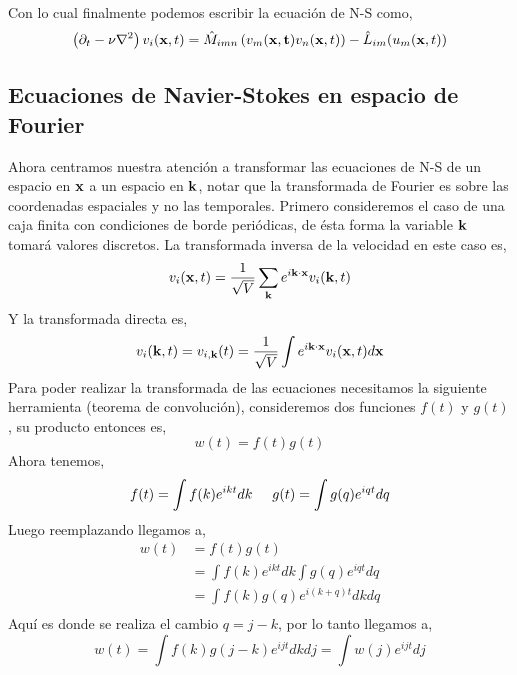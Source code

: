 \documentclass[executivepaper,12pt]{article}
\numberwithin{equation}{section}
\begin{document}
Con lo cual finalmente podemos escribir la ecuación de N-S como,
\begin{equation}
	\left(\partial_t-\nu\laplacian{}\right)v_i(\vb{x},t)=\hat{M}_{imn}\left(v_m(\vb{x,t})v_n(\vb{x},t)\right)-\hat{L}_{im}(u_m(\vb{x},t))
\end{equation}

\subsection{Ecuaciones de Navier-Stokes en espacio de Fourier}

Ahora centramos nuestra atención a transformar las ecuaciones de N-S de un espacio en $\vb{x}$ a un espacio en $\vb{k}$, notar que la transformada de Fourier es sobre las coordenadas espaciales y no las temporales. Primero consideremos el caso de una caja finita con condiciones de borde periódicas, de ésta forma la variable $\vb{k}$ tomará valores discretos. La transformada inversa de la velocidad en este caso es,
\begin{equation*}
	v_i(\vb{x},t)=\frac{1}{\sqrt{V}}\sum_{\vb{k}}e^{i\vb{k}\cdot\vb{x}}v_i(\vb{k},t)
\end{equation*}
Y la transformada directa es,
\begin{equation*}
	v_i(\vb{k},t)=v_{i,\vb{k}}(t)=\frac{1}{\sqrt{V}}\int e^{i\vb{k}\cdot\vb{x}} v_i(\vb{x},t)d\vb{x}
\end{equation*}
Para poder realizar la transformada de las ecuaciones necesitamos la siguiente herramienta (teorema de convolución), consideremos dos funciones $f(t)$ y $g(t)$, su producto entonces es,
\begin{equation*}
	w(t)=f(t)g(t)
\end{equation*}
Ahora tenemos,
\begin{equation*}
	f(t)=\int f(k)e^{ikt}dk \hspace{0.5cm} g(t)=\int g(q)e^{iqt}dq
\end{equation*}
Luego reemplazando llegamos a,
\begin{align*}
	w(t)&=f(t)g(t)\\
	&=\int f(k)e^{ikt}dk\int g(q)e^{iqt}dq\\
	&=\int f(k)g(q)e^{i(k+q)t}dk dq\\
\end{align*}
Aquí es donde se realiza el cambio $q=j-k$, por lo tanto llegamos a,
\begin{equation*}
	w(t)=\int f(k)g(j-k)e^{i j t}dk dj=\int w(j) e^{i j t} dj
\end{equation*}
\end{document}
